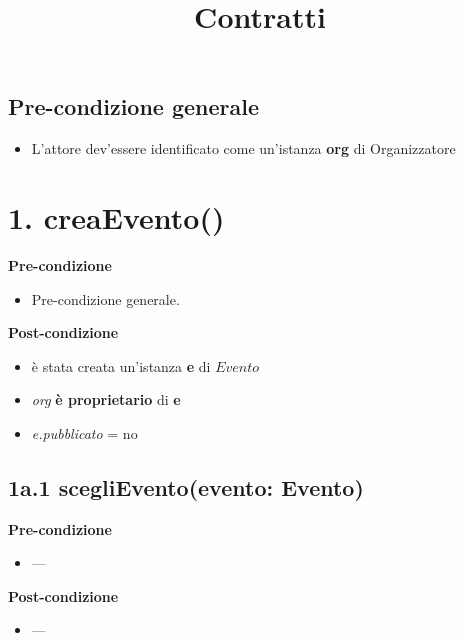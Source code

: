 \documentclass[12pt]{extarticle}
\begin{document}
\title{Contratti}
\date{}
\maketitle

\subsection*{Pre-condizione generale}

\begin{itemize}
  \item L'attore dev'essere identificato come un'istanza \textbf{org} di Organizzatore
\end{itemize}

\section*{1. creaEvento()}

\textbf{Pre-condizione}
\begin{itemize}
  \item Pre-condizione generale.
\end{itemize}
\textbf{Post-condizione}
\begin{itemize}
  \item è stata creata un'istanza \textbf{e} di $Evento$
  \item \textit{org} \textbf{è proprietario} di \textbf{e}
  \item \textit{e.pubblicato} = no
\end{itemize}

\subsection*{1a.1 scegliEvento(evento: Evento)}
\textbf{Pre-condizione}
\begin{itemize}
  \item ---
\end{itemize}
\textbf{Post-condizione}
\begin{itemize}
  \item ---
\end{itemize}

\end{document}
